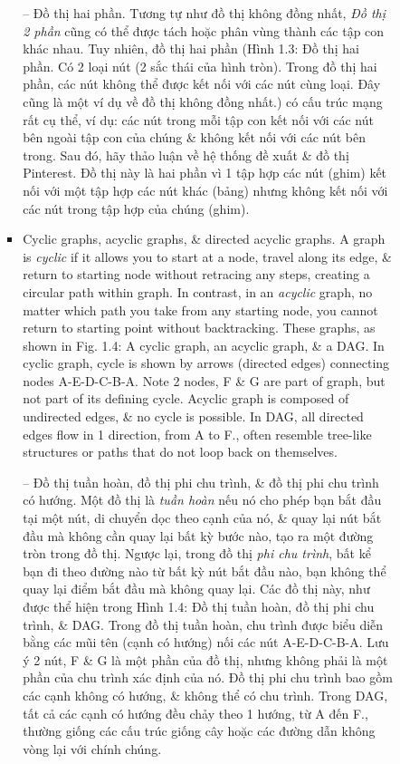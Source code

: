 \documentclass{article}
\begin{document}
\begin{itemize}
\begin{itemize}
\begin{itemize}
\begin{itemize}
                -- {\sf Đồ thị hai phần.} Tương tự như đồ thị không đồng nhất, {\it Đồ thị 2 phần} cũng có thể được tách hoặc phân vùng thành các tập con khác nhau. Tuy nhiên, đồ thị hai phần ({\sf Hình 1.3: Đồ thị hai phần. Có 2 loại nút (2 sắc thái của hình tròn). Trong đồ thị hai phần, các nút không thể được kết nối với các nút cùng loại. Đây cũng là một ví dụ về đồ thị không đồng nhất.}) có cấu trúc mạng rất cụ thể, ví dụ: các nút trong mỗi tập con kết nối với các nút bên ngoài tập con của chúng \& không kết nối với các nút bên trong. Sau đó, hãy thảo luận về hệ thống đề xuất \& đồ thị Pinterest. Đồ thị này là hai phần vì 1 tập hợp các nút (ghim) kết nối với một tập hợp các nút khác (bảng) nhưng không kết nối với các nút trong tập hợp của chúng (ghim).
                \item {\sf Cyclic graphs, acyclic graphs, \& directed acyclic graphs.} A graph is {\it cyclic} if it allows you to start at a node, travel along its edge, \& return to starting node without retracing any steps, creating a circular path within graph. In contrast, in an {\it acyclic} graph, no matter which path you take from any starting node, you cannot return to starting point without backtracking. These graphs, as shown in {\sf Fig. 1.4: A cyclic graph, an acyclic graph, \& a DAG. In cyclic graph, cycle is shown by arrows (directed edges) connecting nodes A-E-D-C-B-A. Note 2 nodes, F \& G are part of graph, but not part of its defining cycle. Acyclic graph is composed of undirected edges, \& no cycle is possible. In DAG, all directed edges flow in 1 direction, from A to F.}, often resemble tree-like structures or paths that do not loop back on themselves.

                -- {\sf Đồ thị tuần hoàn, đồ thị phi chu trình, \& đồ thị phi chu trình có hướng.} Một đồ thị là {\it tuần hoàn} nếu nó cho phép bạn bắt đầu tại một nút, di chuyển dọc theo cạnh của nó, \& quay lại nút bắt đầu mà không cần quay lại bất kỳ bước nào, tạo ra một đường tròn trong đồ thị. Ngược lại, trong đồ thị {\it phi chu trình}, bất kể bạn đi theo đường nào từ bất kỳ nút bắt đầu nào, bạn không thể quay lại điểm bắt đầu mà không quay lại. Các đồ thị này, như được thể hiện trong {\sf Hình 1.4: Đồ thị tuần hoàn, đồ thị phi chu trình, \& DAG. Trong đồ thị tuần hoàn, chu trình được biểu diễn bằng các mũi tên (cạnh có hướng) nối các nút A-E-D-C-B-A. Lưu ý 2 nút, F \& G là một phần của đồ thị, nhưng không phải là một phần của chu trình xác định của nó. Đồ thị phi chu trình bao gồm các cạnh không có hướng, \& không thể có chu trình. Trong DAG, tất cả các cạnh có hướng đều chảy theo 1 hướng, từ A đến F.}, thường giống các cấu trúc giống cây hoặc các đường dẫn không vòng lại với chính chúng.


\end{itemize}
\end{itemize}
\end{itemize}
\end{itemize}
\end{document}
